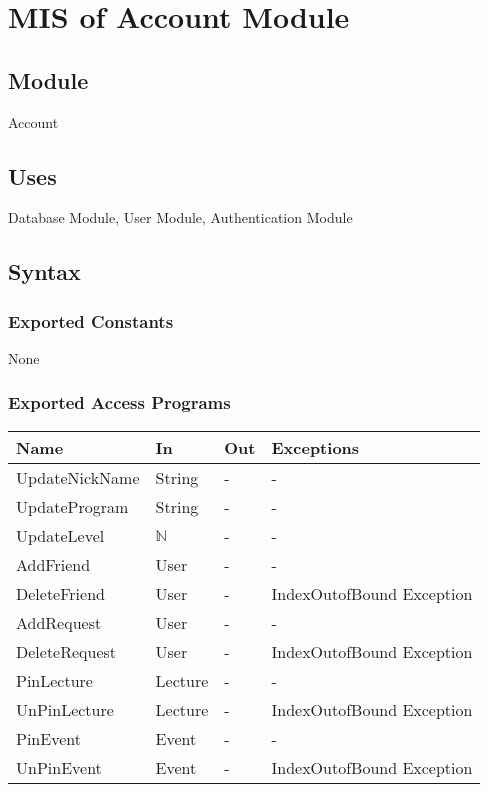 \documentclass[12pt, titlepage]{article}
\begin{document}
\section{MIS of Account Module} \label{mAccount}

\subsection{Module}

Account

\subsection{Uses}

Database Module, User Module, Authentication Module

\subsection{Syntax}

\subsubsection{Exported Constants}
None

\subsubsection{Exported Access Programs}
\begin{center}
\begin{tabular}{p{4cm} p{2cm} p{4cm} p{4cm}}
\hline
\textbf{Name} & \textbf{In} & \textbf{Out} & \textbf{Exceptions} \\
\hline
UpdateNickName & String & - & -\\
UpdateProgram & String & - & -\\
UpdateLevel & $\mathbb{N}$ & - & -\\
AddFriend & User & - & -\\
DeleteFriend & User & - & IndexOutofBound Exception\\
AddRequest & User & - & -\\
DeleteRequest & User & - & IndexOutofBound Exception\\
PinLecture & Lecture & - & -\\
UnPinLecture & Lecture & - & IndexOutofBound Exception\\
PinEvent & Event & - & -\\
UnPinEvent & Event & - & IndexOutofBound Exception\\
\hline
\end{tabular}
\end{center}
\end{document}
